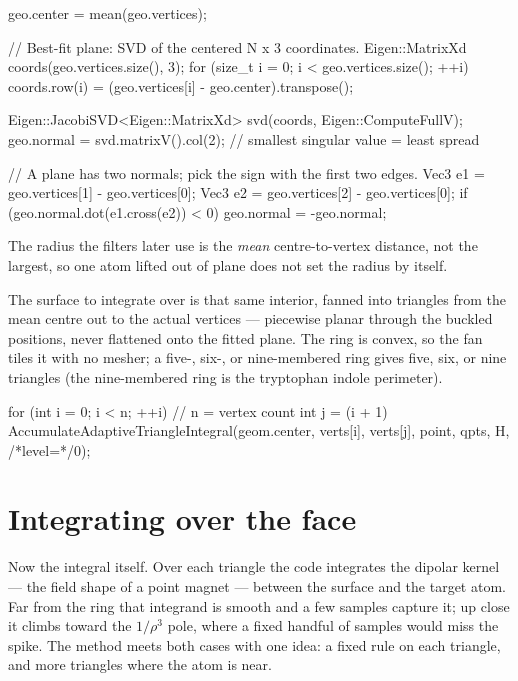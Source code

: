 \documentclass[11pt]{article}
\begin{document}
\begin{codebox}
geo.center = mean(geo.vertices);

// Best-fit plane: SVD of the centered N x 3 coordinates.
Eigen::MatrixXd coords(geo.vertices.size(), 3);
for (size_t i = 0; i < geo.vertices.size(); ++i)
    coords.row(i) = (geo.vertices[i] - geo.center).transpose();

Eigen::JacobiSVD<Eigen::MatrixXd> svd(coords, Eigen::ComputeFullV);
geo.normal = svd.matrixV().col(2);    // smallest singular value = least spread

// A plane has two normals; pick the sign with the first two edges.
Vec3 e1 = geo.vertices[1] - geo.vertices[0];
Vec3 e2 = geo.vertices[2] - geo.vertices[0];
if (geo.normal.dot(e1.cross(e2)) < 0) geo.normal = -geo.normal;
\end{codebox}

The radius the filters later use is the \emph{mean} centre-to-vertex distance, not the
largest, so one atom lifted out of plane does not set the radius by itself.

The surface to integrate over is that same interior, fanned into triangles from the mean
centre out to the actual vertices --- piecewise planar through the buckled positions,
never flattened onto the fitted plane. The ring is convex, so the fan tiles it with no
mesher; a five-, six-, or nine-membered ring gives five, six, or nine triangles (the
nine-membered ring is the tryptophan indole perimeter).

\begin{codebox}
for (int i = 0; i < n; ++i) {                 // n = vertex count
    int j = (i + 1) %
    AccumulateAdaptiveTriangleIntegral(geom.center, verts[i], verts[j],
                                       point, qpts, H, /*level=*/0);
}
\end{codebox}

\section{Integrating over the face}

Now the integral itself. Over each triangle the code integrates the dipolar kernel ---
the field shape of a point magnet --- between the surface and the target atom. Far from
the ring that integrand is smooth and a few samples capture it; up close it climbs toward
the \(1/\rho^3\) pole, where a fixed handful of samples would miss the spike. The method
meets both cases with one idea: a fixed rule on each triangle, and more triangles where
the atom is near.
\end{document}

